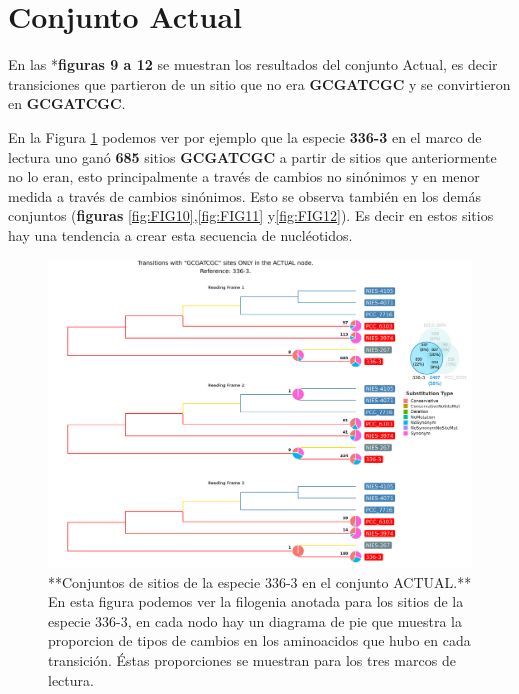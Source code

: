 \documentclass[
]{book}
\begin{document}
\hypertarget{conjunto-actual}{%
\section{Conjunto Actual}\label{conjunto-actual}}

En las *\textbf{figuras 9 a 12} se muestran los resultados del conjunto Actual, es decir transiciones que partieron de un sitio que no era \textbf{GCGATCGC} y se convirtieron en \textbf{GCGATCGC}.

En la Figura \ref{fig:FIG9} podemos ver por ejemplo que la especie \textbf{336-3} en el marco de lectura uno ganó \textbf{685} sitios \textbf{GCGATCGC} a partir de sitios que anteriormente no lo eran, esto principalmente a través de cambios no sinónimos y en menor medida a través de cambios sinónimos. Esto se observa también en los demás conjuntos (\textbf{figuras} \ref{fig:FIG10},\ref{fig:FIG11} y\ref{fig:FIG12}). Es decir en estos sitios hay una tendencia a crear esta secuencia de nucléotidos.

\begin{figure}

{\centering \includegraphics[width=1.2\linewidth]{Clados/Calothrix_B/figures/A/GCGATCGC/Actual/336-3_Actual_A_tree} 

}

\caption{**Conjuntos de sitios de la especie 336-3 en el conjunto ACTUAL.** En esta figura podemos ver la filogenia anotada para los sitios de la especie 336-3, en cada nodo hay un diagrama de pie que muestra la proporcion de tipos de cambios en los aminoacidos que hubo en cada transición. Éstas proporciones se muestran para los tres marcos de lectura.}\label{fig:FIG9}
\end{figure}
\end{document}
